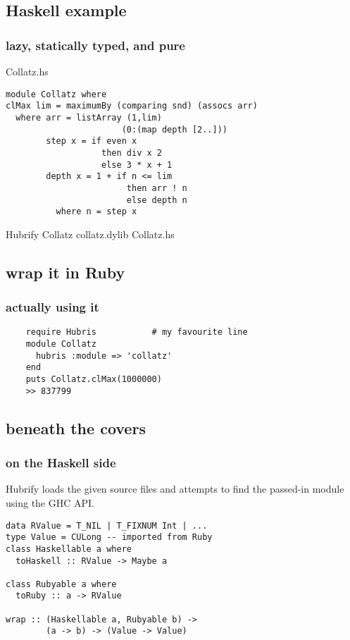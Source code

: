 \documentclass{beamer}
\begin{document}
\lstset{language=Haskell}
\subsection{Haskell example}
\begin{frame}[fragile]
  \frametitle{lazy, statically typed, and pure}
  Collatz.hs
  \begin{lstlisting}
module Collatz where
clMax lim = maximumBy (comparing snd) (assocs arr)
  where arr = listArray (1,lim) 
                       (0:(map depth [2..]))
        step x = if even x 
                   then div x 2 
                   else 3 * x + 1
        depth x = 1 + if n <= lim 
                        then arr ! n 
                        else depth n
          where n = step x    
  \end{lstlisting}
  Hubrify Collatz collatz.dylib Collatz.hs

\end{frame}

\subsection{wrap it in Ruby}
\begin{frame}[fragile]
  \frametitle{actually using it}
  \lstset{language=Ruby}
  \begin{lstlisting}
    require Hubris           # my favourite line
    module Collatz
      hubris :module => 'collatz'
    end
    puts Collatz.clMax(1000000)
    >> 837799
  \end{lstlisting}
\end{frame}

\subsection{beneath the covers}
\begin{frame}[fragile]
  \frametitle{on the Haskell side}
  Hubrify loads the given source files and attempts to find the
  passed-in module using the GHC API.
\lstset{language=Haskell}
\begin{lstlisting}
data RValue = T_NIL | T_FIXNUM Int | ...
type Value = CULong -- imported from Ruby
class Haskellable a where
  toHaskell :: RValue -> Maybe a

class Rubyable a where
  toRuby :: a -> RValue

wrap :: (Haskellable a, Rubyable b) -> 
        (a -> b) -> (Value -> Value)
\end{lstlisting}
\end{frame}
\end{document}
